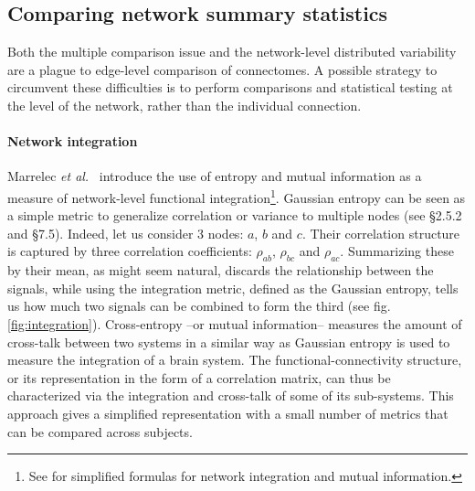 \documentclass[5p]{elsarticle}
\begin{document}

\subsection{Comparing network summary statistics}

Both the multiple comparison issue and the network-level distributed
variability are a plague to edge-level comparison of connectomes. A
possible strategy to circumvent these difficulties is to perform
comparisons and statistical testing at the level of the network, rather
than the individual connection. 

\paragraph{Network integration}
%
Marrelec \emph{et al.}\
\cite{marrelec2008} introduce the use of entropy and mutual information
as a measure of network-level functional integration\footnote{See \cite{varoquaux2010c}
for simplified formulas for network integration and mutual information.}.
Gaussian entropy can be seen as a simple metric to generalize correlation
or variance to multiple nodes (see \cite{anderson1958} \S2.5.2 and
\S7.5). Indeed, let us consider 3 nodes: $a$, $b$ and $c$. Their
correlation structure is captured by three correlation coefficients:
$\rho_{ab}$, $\rho_{bc}$ and $\rho_{ac}$. Summarizing these by their
mean, as might seem natural, discards the relationship between the
signals, while using the integration metric, defined as the Gaussian entropy, tells us how much two signals can be
combined to form the third (see fig.\,\ref{fig:integration}). 
Cross-entropy --or mutual information--
\cite{marrelec2008} measures the amount of cross-talk between two
systems in a similar way as Gaussian entropy is used to measure the
integration of a brain
system. The functional-connectivity structure, or its representation in
the form of a correlation matrix, can thus be characterized via the
integration and cross-talk of some of its sub-systems. This approach
gives a simplified representation with a small number of metrics that can
be compared across subjects.
\end{document}
